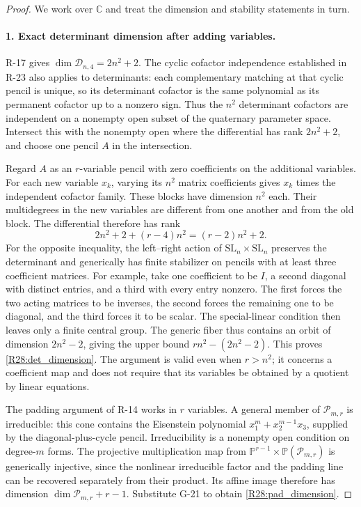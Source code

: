 \begin{proof}
We work over $\mathbb C$ and treat the dimension and stability statements in turn.

\paragraph{1. Exact determinant dimension after adding variables.}
R-17 gives $\dim\mathcal D_{n,4}=2n^2+2$. The cyclic
cofactor independence established in R-23 also applies to
determinants: each complementary matching at that cyclic
pencil is unique, so its determinant cofactor is the same
polynomial as its permanent cofactor up to a nonzero sign.
Thus the $n^2$ determinant cofactors are independent on a
nonempty open subset of the quaternary parameter space.
Intersect this with the nonempty open where the differential
has rank $2n^2+2$, and choose one pencil $A$ in the intersection.

Regard $A$ as an $r$-variable pencil with zero coefficients
on the additional variables. For each new variable $x_k$,
varying its $n^2$ matrix coefficients gives $x_k$ times the
independent cofactor family. These blocks have dimension
$n^2$ each. Their multidegrees in the new variables are
different from one another and from the old block. The
differential therefore has rank
\[
 2n^2+2+(r-4)n^2=(r-2)n^2+2.
\]
For the opposite inequality, the left--right action of
$\mathrm{SL}_n\times\mathrm{SL}_n$ preserves the determinant
and generically has finite stabilizer on pencils with at
least three coefficient matrices. For example, take one
coefficient to be $I$, a second diagonal with distinct entries,
and a third with every entry nonzero. The first forces the
two acting matrices to be inverses, the second forces the
remaining one to be diagonal, and the third forces it to be
scalar. The special-linear condition then leaves only a
finite central group. The generic fiber thus contains an
orbit of dimension $2n^2-2$, giving the upper bound
$rn^2-(2n^2-2)$. This proves \eqref{R28:det_dimension}.
The argument is valid even when $r>n^2$; it concerns a
coefficient map and does not require that its variables be
obtained by a quotient by linear equations.

The padding argument of R-14 works in $r$ variables. A general
member of $\mathcal P_{m,r}$ is irreducible: this cone contains
the Eisenstein polynomial $x_1^m+x_2^{m-1}x_3$, supplied by
the diagonal-plus-cycle pencil. Irreducibility is a nonempty
open condition on degree-$m$ forms. The projective multiplication
map from $\mathbb P^{r-1}\times\mathbb P(\mathcal P_{m,r})$
is generically injective, since the nonlinear irreducible
factor and the padding line can be recovered separately from
their product. Its affine image therefore has dimension
$\dim\mathcal P_{m,r}+r-1$. Substitute G-21 to obtain
\eqref{R28:pad_dimension}.


\end{proof}
